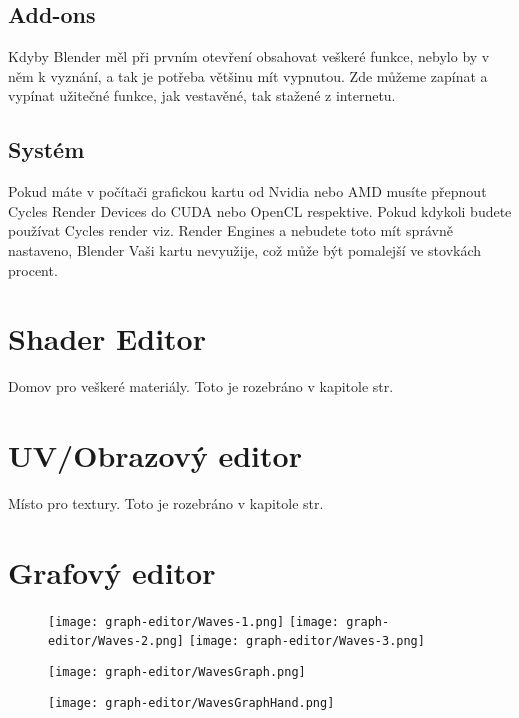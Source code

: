 \documentclass[12pt,a4paper]{report}
\begin{document}
	\subsection{Add-ons}
	Kdyby Blender měl při prvním otevření obsahovat veškeré funkce, nebylo
	by v něm k vyznání, a tak je potřeba většinu mít vypnutou. Zde můžeme
	zapínat a vypínat užitečné funkce, jak vestavěné, tak stažené z internetu.
	
	\subsection{Systém}
	Pokud máte v počítači grafickou kartu od Nvidia nebo AMD musíte
	přepnout Cycles Render Devices do CUDA nebo OpenCL respektive. Pokud
	kdykoli budete používat Cycles render viz. Render Engines a nebudete
	toto mít správně nastaveno, Blender Vaši kartu nevyužije, což může být
	pomalejší ve stovkách procent.
	
	\section{Shader Editor}
	Domov pro veškeré materiály.
	Toto je rozebráno v kapitole  str. \pageref{section:materials}
	
	\section{UV/Obrazový editor}
	Místo pro textury.
	Toto je rozebráno v kapitole  str. \pageref{section:materials}
	
	\section{Grafový editor}
	
	\begin{figure}
		\centering
		\texttt{[image: graph-editor/Waves-1.png]}
		\texttt{[image: graph-editor/Waves-2.png]}
		\texttt{[image: graph-editor/Waves-3.png]}
		\caption{}
		\label{pic:graph-waves-cube}
	\end{figure}
	
	\begin{figure}
		\centering
		\texttt{[image: graph-editor/WavesGraph.png]}
		\caption{}
		\label{pic:graph-waves}
	\end{figure}
	
	\begin{figure}
		\centering
		\texttt{[image: graph-editor/WavesGraphHand.png]}
		\caption{}
		\label{pic:graph-waves-hand}
	\end{figure}
	
\end{document}
